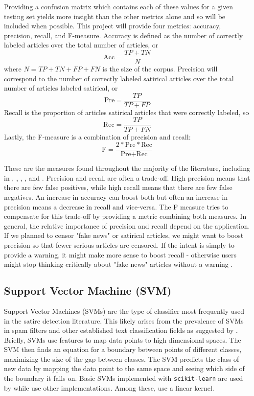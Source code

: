 \documentclass [12 pt] {report}
\begin{document}
Providing a confusion matrix which contains each of these values for a given testing set yields more insight than the other metrics alone and so will be included when possible. This project will provide four metrics: accuracy, precision, recall, and F-measure. Accuracy is defined as the number of correctly labeled articles over the total number of articles, or $$\text{Acc} = \frac{TP + TN}{N}$$ where $N = TP + TN + FP + FN$ is the size of the corpus. Precision will correspond to the number of correctly labeled satirical articles over the total number of articles labeled satirical, or $$\text{Pre} = \frac{TP}{TP + FP}$$ Recall is the proportion of articles satirical articles that were correctly labeled, so $$\text{Rec} = \frac{TP}{TP + FN}$$ Lastly, the F-measure is a combination of precision and recall: $$\text{F} = \frac{2*\text{Pre}*\text{Rec}}{\text{Pre} + \text{Rec}}$$

These are the measures found throughout the majority of the literature, including in \cite{Ahmad}, \cite{Burfoot}, \cite{Twitter}, \cite{fakeNews}, and \cite{Yang}. Precision and recall are often a trade-off. High precision means that there are few false positives, while high recall means that there are few false negatives. An increase in accuracy can boost both but often an increase in precision means a decrease in recall and vice-versa. The F measure tries to compensate for this trade-off by providing a metric combining both measures. In general, the relative importance of precision and recall depend on the application. If we planned to censor "fake news" or satirical articles, we might want to boost precision so that fewer serious articles are censored. If the intent is simply to provide a warning, it might make more sense to boost recall - otherwise users might stop thinking critically about "fake news" articles without a warning \cite{warnings}.

\subsection{Support Vector Machine (SVM)}
Support Vector Machines (SVMs) are the type of classifier most frequently used in the satire detection literature. This likely arises from the prevalence of SVMs in spam filters and other established text classification fields as suggested by \cite{Burfoot}. Briefly, SVMs use features to map data points to high dimensional spaces. The SVM then finds an equation for a boundary between points of different classes, maximizing the size of the gap between classes. The SVM predicts the class of new data by mapping the data point to the same space and seeing which side of the boundary it falls on. Basic SVMs implemented with \texttt{scikit-learn} are used by \cite{Burfoot} \cite{fakeNews} \cite{Yang} while \cite{Ahmad} \cite{Horne} use other implementations. Among these, \cite{Horne} \cite{fakeNews} \cite{Yang} use a linear kernel.
\end{document}
